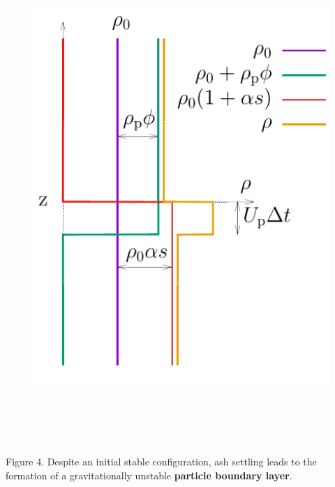 \documentclass[final]{beamer} %
\begin{document}
\begin{frame}[t]
\begin{columns}[t]
\begin{column}{0.3\paperwidth}
\begin{columns}[t]
\begin{column}{0.17\paperwidth}
          \begin{figure}
            \includegraphics[height=18cm]{unstable_config.pdf}
          \end{figure}
        \end{column}
        
      \end{columns}

      \vspace{-1cm}

      \centering \footnotesize Figure 4. Despite an initial stable
      configuration, ash settling leads to the formation of a gravitationally
      unstable \textbf{particle boundary layer}.

      \vspace{1cm}

      \normalsize


\end{column}
\end{columns}
\end{frame}
\end{document}
